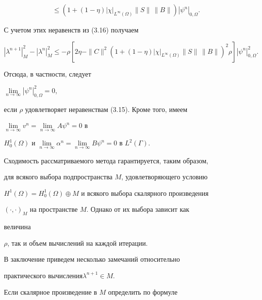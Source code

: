\begin{pf}
\begin{multline*}
% 


\le(1+(1-\eta)|\chi|_{L^\infty(\Omega)}\|S\|\,\|B\|) 


|\psi^n|_{0,\Omega}. 


\end{multline*} 


С учетом этих неравенств из (3.16) получаем 


$$ 


|\lambda^{n+1}|^2_M-|\lambda^n|^2_M\le-\rho[2\eta-\|C\|^2 


(1+(1-\eta)|\chi|_{L^\infty(\Omega)}\|S\|\,\|B\|)^2\rho] 


|\psi^n|^2_{0,\Omega}. 


$$ 


Отсюда, в частности, следует 


$\lim\limits_{n\to\infty}|\psi^n|^2_{0,\Omega}=0$, 


если $\rho$ удовлетворяет неравенствам (3.15). Кроме того, имеем 


$\lim\limits_{n\to\infty}v^n=\lim\limits_{n\to\infty}A\psi^n=0$ в 


$H^1_0(\Omega)$ и $\lim\limits_{n\to\infty}\alpha^n=\lim\limits_{n\to\infty} 


B\psi^n=0$ в $L^2(\Gamma)$. 


\end{pf} 


 


 


Сходимость рассматриваемого метода гарантируется, таким образом, 


для всякого выбора подпространства $M$, удовлетворяющего условию 


$H^1(\Omega)=H^1_0(\Omega)\oplus M$ и всякого выбора скалярного произведения 


$(\cdot,\cdot)_M$ на пространстве $M$. Однако от их выбора зависит как 


величина 


$\rho$, так и объем вычислений на каждой итерации. 


 


В заключение приведем несколько замечаний относительно 


практического вычисления\linebreak $\lambda^{n+1}\in M$. 


 


Если скалярное произведение в $M$ определить по формуле 


